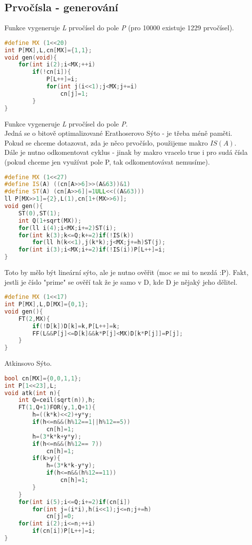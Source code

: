 \documentclass[11pt]{article}
\begin{document}
\subsection{Prvočísla - generování}
Funkce vygeneruje \textsl{L} prvočísel do pole \textsl{P} (pro 10000 existuje 1229 prvočísel).
\begin{lstlisting}[language=C++]
#define MX (1<<20)
int P[MX],L,cn[MX]={1,1};
void gen(void){
    for(int i(2);i<MX;++i)
        if(!cn[i]){
            P[L++]=i;
            for(int j(i<<1);j<MX;j+=i)
                cn[j]=1;
        }
}
\end{lstlisting}
Funkce vygeneruje \textsl{L} prvočísel do pole \textsl{P}.
\\Jedná se o bitově optimalizované Erathoserovo Sýto - je třeba méně paměti.
\\Pokud se chceme dotazovat, zda je něco prvočíslo, použijeme makro $IS(A)$. Dále je nutno odkomentovat cyklus - jinak by makro vracelo true i pro sudá čísla (pokud chceme jen využívat pole \textsf{P}, tak odkomentovávat nemusíme).
\begin{lstlisting}[language=C++]
#define MX (1<<27)
#define IS(A) ((cn[A>>6]>>(A&63))&1)
#define ST(A) (cn[A>>6]|=1ULL<<((A&63)))
ll P[MX>>1]={2},L(1),cn[1+(MX>>6)];
void gen(){
    ST(0),ST(1);
    int Q(1+sqrt(MX));
    for(ll i(4);i<MX;i+=2)ST(i);
    for(int k(3);k<=Q;k+=2)if(!IS(k))
        for(ll h(k<<1),j(k*k);j<MX;j+=h)ST(j);
    for(int i(3);i<MX;i+=2)if(!IS(i))P[L++]=i;
}
\end{lstlisting}
Toto by mělo být lineární sýto, ale je nutno ověřit (moc se mi to nezdá :P). Fakt, jestli je číslo "prime" se ověří tak že je samo v \textsf{D}, kde \textsf{D} je nějaký jeho dělitel.
\begin{lstlisting}[language=C++]
#define MX (1<<17)
int P[MX],L,D[MX]={0,1};
void gen(){
    FT(2,MX){
        if(!D[k])D[k]=k,P[L++]=k;
        FF(L&&P[j]<=D[k]&&k*P[j]<MX)D[k*P[j]]=P[j];
    }
}
\end{lstlisting}
Atkinsovo Sýto.
\begin{lstlisting}[language=C++]
bool cn[MX]={0,0,1,1};
int P[1<<23],L;
void atk(int n){
    int Q=ceil(sqrt(n)),h;
    FT(1,Q+1)FOR(y,1,Q+1){
        h=((k*k)<<2)+y*y;
        if(h<=n&&(h%12==1||h%12==5))
            cn[h]=1;
        h=(3*k*k+y*y);
        if(h<=n&&(h%12== 7))
            cn[h]=1;
        if(k>y){
            h=(3*k*k-y*y);
            if(h<=n&&(h%12==11))
                cn[h]=1;
        }
    }
    for(int i(5);i<=Q;i+=2)if(cn[i])
        for(int j=(i*i),h(i<<1);j<=n;j+=h)
            cn[j]=0;
    for(int i(2);i<=n;++i)
        if(cn[i])P[L++]=i;
}
\end{lstlisting}
\end{document}
